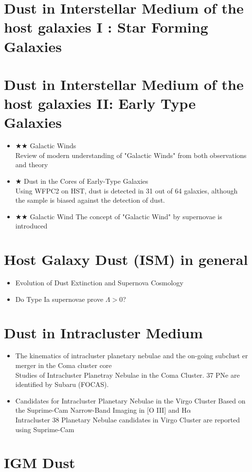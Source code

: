 \section{Dust in Interstellar Medium of the host galaxies I : Star Forming Galaxies}

\section{Dust in Interstellar Medium of the host galaxies II: Early Type Galaxies}
\begin{itemize}
\item $\bigstar\bigstar$ Galactic Winds \citep[][\#191, 5/18/10, veilleux05a]{veilleux05a}\\
Review of modern understanding of "Galactic Winds" from both observations and theory
\item $\bigstar$ Dust in the Cores of Early-Type Galaxies \citep[][\#184, 5/20/10, vandokkum95a]{vandokkum95a}\\
Using WFPC2 on HST, dust is detected in 31 out of 64 galaxies, 
although the sample is biased against the detection of dust.
\item $\bigstar\bigstar$ Galactic Wind \citep[][\#397, 5/20/10, mathews71a]{mathews71a}
The concept of "Galactic Wind" by supernovae is introduced
\end{itemize}

\section{Host Galaxy Dust (ISM) in general}
\begin{itemize}
\item Evolution of Dust Extinction and Supernova Cosmology
\citep[][\#25, 5/3/10, totani99a]{totani99a}\\

\item Do Type Ia supernovae prove $\Lambda >$0?
\cite[][]{rowanrobinson02a}\\
\end{itemize}

\section{Dust in Intracluster Medium}
\begin{itemize}
\item The kinematics of intracluster planetary nebulae and the on-going subclust
er merger in the Coma cluster core \citep{gerhard07a}\\
Studies of Intracluster Planetray Nebulae in the Coma Cluster. 37 PNe are identified
by Subaru (FOCAS).
\item Candidates for Intracluster Planetary Nebulae in the Virgo Cluster Based on the Suprime-Cam Narrow-Band Imaging in [O III] and H$\alpha$ \citep{okamura02a}\\
Intracluster 38 Planetary Nebulae candidates in Virgo Cluster are reported using Suprime-Cam
\end{itemize}

\section{IGM Dust}
